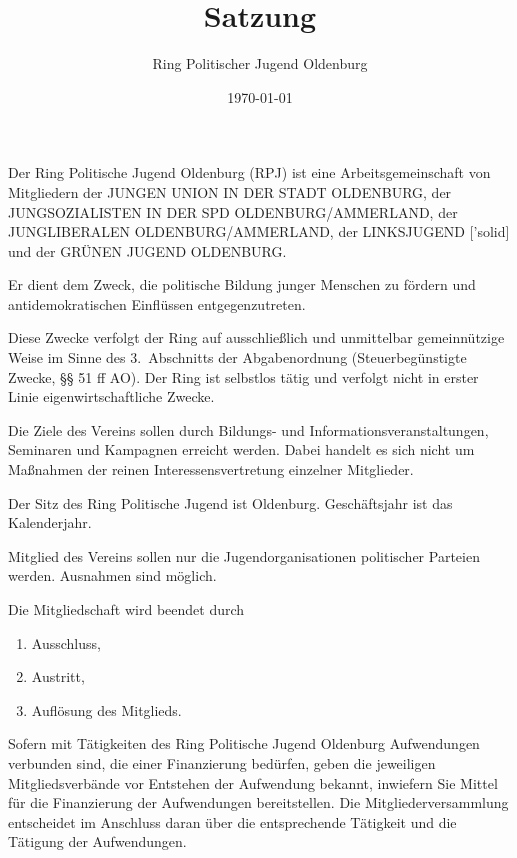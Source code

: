 \documentclass[10pt,a4paper,oneside,parskip=half]{scrartcl}
\title{Satzung}
\date{\today}
\author{Ring Politischer Jugend Oldenburg}
\begin{document}
\maketitle

\begin{contract}

Der Ring Politische Jugend Oldenburg (RPJ) ist eine Arbeitsgemeinschaft von Mitgliedern der JUNGEN UNION IN DER STADT OLDENBURG, der JUNGSOZIALISTEN IN DER SPD OLDENBURG/AMMERLAND, der JUNGLIBERALEN OLDENBURG/AMMERLAND, der LINKSJUGEND ['solid] und der GRÜNEN JUGEND OLDENBURG.

Er dient dem Zweck, die politische Bildung junger Menschen zu fördern und antidemokratischen Einflüssen entgegenzutreten.

Diese Zwecke verfolgt der Ring auf ausschließlich und unmittelbar gemeinnützige Weise im Sinne des 3.~Abschnitts der Abgabenordnung (Steuerbegünstigte Zwecke, §§ 51 ff AO). Der Ring ist selbstlos tätig und verfolgt nicht in erster Linie eigenwirtschaftliche Zwecke.

Die Ziele des Vereins sollen durch Bildungs- und Informationsveranstaltungen, Seminaren und Kampagnen erreicht werden. Dabei handelt es sich nicht um Maßnahmen der reinen Interessensvertretung einzelner Mitglieder.

Der Sitz des Ring Politische Jugend ist Oldenburg. Geschäftsjahr ist das Kalenderjahr.

Mitglied des Vereins sollen nur die Jugendorganisationen politischer Parteien werden. Ausnahmen sind möglich.

Die Mitgliedschaft wird beendet durch
\begin{enumerate}
\item Ausschluss,
\item Austritt,
\item Auflösung des Mitglieds.
\end{enumerate}

Sofern mit Tätigkeiten des Ring Politische Jugend Oldenburg Aufwendungen verbunden sind, die einer Finanzierung bedürfen, geben die jeweiligen Mitgliedsverbände vor Entstehen der Aufwendung bekannt, inwiefern Sie Mittel für die Finanzierung der Aufwendungen bereitstellen. Die Mitgliederversammlung entscheidet im Anschluss daran über die entsprechende Tätigkeit und die Tätigung der Aufwendungen.


\end{contract}
\end{document}
